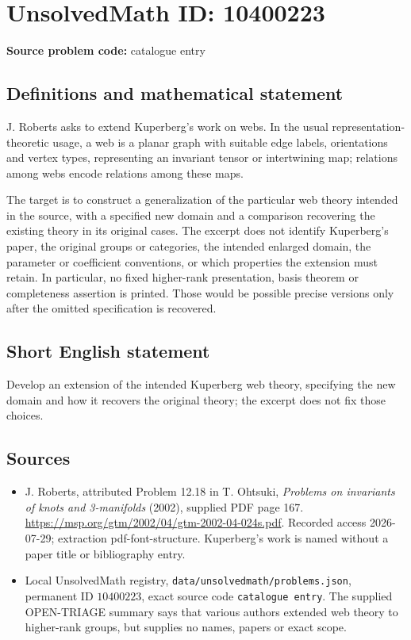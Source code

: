 \documentclass[11pt]{article}
\begin{document}
\section*{UnsolvedMath ID: 10400223}
\textbf{Source problem code:} catalogue entry
\subsection{Definitions and mathematical statement}
J. Roberts asks to extend Kuperberg's work on webs. In the usual representation-theoretic usage, a web is a planar graph with suitable edge labels, orientations and vertex types, representing an invariant tensor or intertwining map; relations among webs encode relations among these maps.

The target is to construct a generalization of the particular web theory intended in the source, with a specified new domain and a comparison recovering the existing theory in its original cases. The excerpt does not identify Kuperberg's paper, the original groups or categories, the intended enlarged domain, the parameter or coefficient conventions, or which properties the extension must retain. In particular, no fixed higher-rank presentation, basis theorem or completeness assertion is printed. Those would be possible precise versions only after the omitted specification is recovered.
\subsection{Short English statement}
Develop an extension of the intended Kuperberg web theory, specifying the new domain and how it recovers the original theory; the excerpt does not fix those choices.
\subsection{Sources}
\begin{itemize}
\item J. Roberts, attributed Problem 12.18 in T. Ohtsuki, \emph{Problems on invariants of knots and 3-manifolds} (2002), supplied PDF page 167. \url{https://msp.org/gtm/2002/04/gtm-2002-04-024s.pdf}. Recorded access 2026-07-29; extraction pdf-font-structure. Kuperberg's work is named without a paper title or bibliography entry.
\item Local UnsolvedMath registry, \texttt{data/unsolvedmath/problems.json}, permanent ID \(10400223\), exact source code \texttt{catalogue entry}. The supplied OPEN-TRIAGE summary says that various authors extended web theory to higher-rank groups, but supplies no names, papers or exact scope.
\end{itemize}
\end{document}
